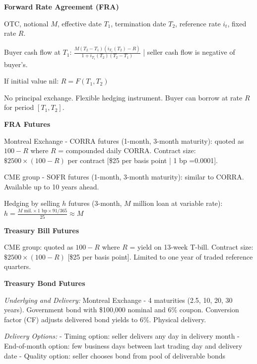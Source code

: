 \documentclass[12pt,a4paper]{article}
\begin{document}
\vspace{0.5em}

\textbf{Forward Rate Agreement (FRA)}
\vspace{0.5em}

OTC, notional $M$, effective date $T_1$, termination date $T_2$, reference rate $i_{t}$, fixed rate $R$.

Buyer cash flow at $T_1$: $\frac{M(T_2 - T_1)(i_{T_1}(T_2) - R)}{1 + i_{T_1}(T_2)(T_2 - T_1)}$ | seller cash flow is negative of buyer's.

If initial value nil: $R = F(T_1, T_2)$

No principal exchange. Flexible hedging instrument. Buyer can borrow at rate $R$ for period $[T_1, T_2]$.

\vspace{0.5em}

\textbf{FRA Futures}
\vspace{0.5em}

Montreal Exchange - CORRA futures (1-month, 3-month maturity): quoted as $100 - R$ where $R$ = compounded daily CORRA. Contract size: $\$2500 \times (100 - R)$ per contract [\$25 per basis point | 1 bp =0.0001].

CME group - SOFR futures (1-month, 3-month maturity): similar to CORRA. Available up to 10 years ahead.

Hedging by selling $h$ futures (3-month, $M$ million loan at variable rate): $h = \frac{M \text{ mil.} \times 1 \text{ bp} \times 91/365}{25} \approx M$

\vspace{0.5em}

\textbf{Treasury Bill Futures}
\vspace{0.5em}

CME group: quoted as $100 - R$ where $R$ = yield on 13-week T-bill. Contract size: $\$2500 \times (100 - R)$ [\$25 per basis point]. Limited to one year of traded reference quarters.

\vspace{0.5em}

\textbf{Treasury Bond Futures}
\vspace{0.5em}

\textit{Underlying and Delivery:} Montreal Exchange - 4 maturities (2.5, 10, 20, 30 years). Government bond with \$100,000 nominal and 6\% coupon. Conversion factor (CF) adjusts delivered bond yields to 6\%. Physical delivery.

\textit{Delivery Options:} 
- Timing option: seller delivers any day in delivery month
- End-of-month option: few business days between last trading day and delivery date  
- Quality option: seller chooses bond from pool of deliverable bonds
\end{document}
